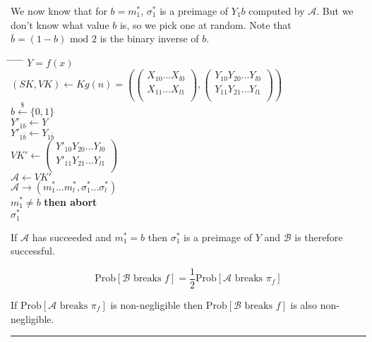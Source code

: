 \documentclass[twoside]{article}
\newenvironment{proof}{{\bf Proof:}}{\hfill\rule{2mm}{2mm}}
\begin{document}
\begin{proof}
We now know that for $b = m^*_1$, $\sigma^*_1$ is a preimage of $Y_1b$ computed by $\mathcal{A}$. But we don't know what value $b$ is, so we pick one at random. Note that $\bar{b} = (1 - b) \text{ mod } 2$ is the binary inverse of $b$.

\begin{tabbing}
\hspace*{.25in} \= \hspace*{.25in} \= \hspace*{.25in} \= \hspace*{.25in} \= \hspace*{.25in} \=\kill
{} $Y = f(x)$\\
\>$(SK, VK) \leftarrow Kg(n) = \left(
\begin{pmatrix}
X_{10}...X_{l0}\\
X_{11}...X_{l1}\\
\end{pmatrix},
\begin{pmatrix}
Y_{10}Y_{20}...Y_{l0}\\
Y_{11}Y_{21}...Y_{l1}\\
\end{pmatrix}\right)$\\
\>$b \xleftarrow{\$} \{0,1\}$\\
\>$Y'_{1b} \leftarrow Y$\\
\>$Y'_{1\bar{b}} \leftarrow Y_{1\bar{b}}$\\
\>$VK' \leftarrow
\begin{pmatrix}
Y'_{10}Y_{20}...Y_{l0}\\
Y'_{11}Y_{21}...Y_{l1}\\
\end{pmatrix}$\\
\>$\mathcal{A} \leftarrow VK'$\\
\>$\mathcal{A} \rightarrow (m^*_1...m^*_l,\sigma^*_1...\sigma^*_l)$\\
 $m^*_1 \neq b$ {\bf then abort}\\
 $\sigma^*_1$
\end{tabbing}

If $\mathcal{A}$ has succeeded and $m^*_1 = b$ then $\sigma_1^*$ is a preimage of $Y$ and $\mathcal{B}$ is therefore successful.

$$\text{Prob}[\mathcal{B}\text{ breaks }f] = \frac{1}{2}\text{Prob}[\mathcal{A}\text{ breaks }\pi_f]$$

If $\text{Prob}[\mathcal{A}\text{ breaks }\pi_f]$ is non-negligible then $\text{Prob}[\mathcal{B}\text{ breaks }f]$ is also non-negligible.
\end{proof}
\end{document}
